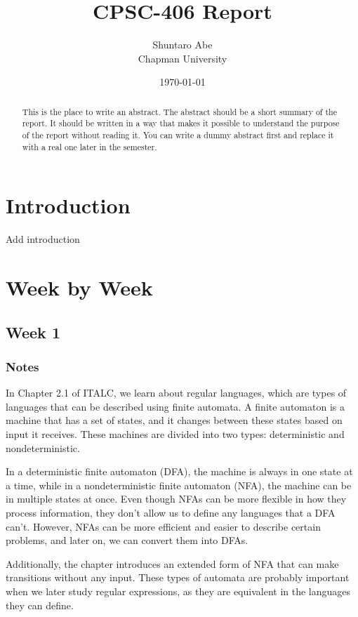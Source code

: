 \documentclass{article}
\title{CPSC-406 Report}
\author{Shuntaro Abe  \\ Chapman University}
\date{\today}
\theoremstyle{theorem}
\theoremstyle{definition}
\theoremstyle{remark}
\begin{document}
\maketitle

\begin{abstract}
This is the place to write an abstract. The abstract should be a short summary of the report. It should be written in a way that makes it possible to understand the purpose of the report without reading it. You can write a dummy abstract first and replace it with a real one later in the semester.
\end{abstract}

\setcounter{tocdepth}{3}
\tableofcontents

\section{Introduction}\label{intro}

Add introduction

\section{Week by Week}\label{homework}

\subsection{Week 1}


\subsubsection{Notes}

In Chapter 2.1 of ITALC, we learn about regular languages, which are types of languages that can be described using finite automata. A finite automaton is a machine that has a set of states, and it changes between these states based on input it receives. These machines are divided into two types: deterministic and nondeterministic.

In a deterministic finite automaton (DFA), the machine is always in one state at a time, while in a nondeterministic finite automaton (NFA), the machine can be in multiple states at once. Even though NFAs can be more flexible in how they process information, they don’t allow us to define any languages that a DFA can’t. However, NFAs can be more efficient and easier to describe certain problems, and later on, we can convert them into DFAs.

Additionally, the chapter introduces an extended form of NFA that can make transitions without any input. These types of automata are probably important when we later study regular expressions, as they are equivalent in the languages they can define.
\end{document}

